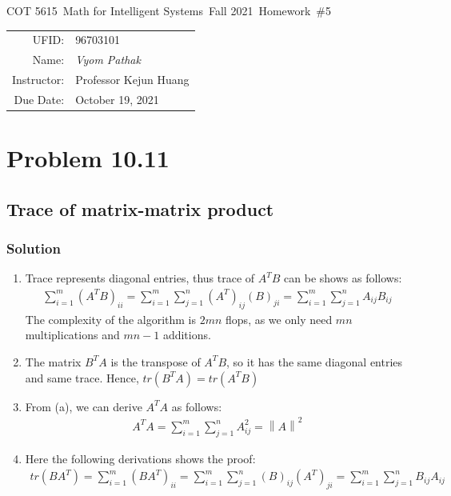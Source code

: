 \documentclass{article}
\newcommand{\hmwkTitle}{Homework\ \#5}
\newcommand{\hmwkDueDate}{October 19, 2021}
\newcommand{\hmwkClassCode}{COT 5615}
\newcommand{\hmwkClass}{Math for Intelligent Systems}
\newcommand{\hmwkClassYear}{Fall 2021}
\newcommand{\hmwkClassInstructor}{Professor Kejun Huang}
\newcommand{\hmwkAuthorName}{\textit{Vyom Pathak}}
\newcommand{\hmwkUFID}{96703101}
\newcommand{\norm}[1]{\left\lVert#1\right\rVert}
\begin{document}
\begin{center}
{\Large \hmwkClassCode\ \hmwkClass\ \hmwkClassYear\ \hmwkTitle}

\begin{tabular}{rl}
UFID: & \hmwkUFID \\
Name: & \hmwkAuthorName \\
Instructor: & \hmwkClassInstructor \\
Due Date: & \hmwkDueDate \\ 
\end{tabular}
\end{center}

\section*{Problem 10.11}
\subsection*{Trace of matrix-matrix product}
\subsubsection*{Solution}
\begin{enumerate}[label=\alph*]
    \item Trace represents diagonal entries, thus trace of $A^TB$ can be shows as follows:
    \begin{align*}
        \sum\limits_{i=1}^m (A^TB)_{ii} = \sum\limits_{i=1}^m \sum\limits_{j=1}^n (A^T)_{ij}(B)_{ji} = \sum\limits_{i=1}^m \sum\limits_{j=1}^n A_{ij}B_{ij}
    \end{align*}
    The complexity of the algorithm is $2mn$ flops, as we only need $mn$ multiplications and $mn-1$ additions.
    \item The matrix $B^TA$ is the transpose of $A^TB$, so it has the same diagonal entries and same trace. Hence, $tr(B^TA)=tr(A^TB)$
    \item From (a), we can derive $A^TA$ as follows:
    \begin{align*}
        A^TA = \sum\limits_{i=1}^m \sum\limits_{j=1}^n A^2_{ij} = \norm{A}^2
    \end{align*}
    \item Here the following derivations shows the proof:
    \begin{align*}
        tr(BA^T) = \sum\limits_{i=1}^m (BA^T)_{ii} = \sum\limits_{i=1}^m \sum\limits_{j=1}^n (B)_{ij}(A^T)_{ji} = \sum\limits_{i=1}^m \sum\limits_{j=1}^n B_{ij}A_{ij}
    \end{align*}
\end{enumerate}
\end{document}

